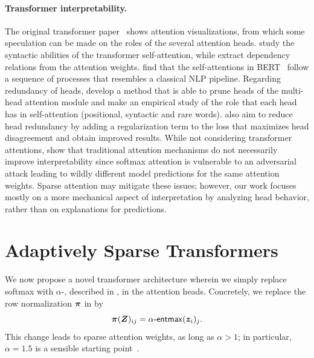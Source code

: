 \paragraph*{Transformer interpretability.} The original transformer
paper~\citep{vaswani2017attention} shows attention visualizations,
from which some speculation can be made on the roles of the several
attention heads. \citet{marecek-rosa-2018-extracting} study the
syntactic abilities of the transformer self-attention, while
\citet{raganato2018analysis} extract dependency relations from the
attention weights. \citet{bert-rediscovers} find that the
self-attentions in BERT~\citep{devlin2018bert} follow a sequence of
processes that resembles a classical NLP pipeline. Regarding
redundancy of heads, \citet{specialized} develop a method that is
able to prune heads of the multi-head attention module and make an
empirical study of the role that each head has in self-attention
(positional, syntactic and rare words). \citet{li2018multi} also aim
to reduce head redundancy by adding a regularization term to the loss
that maximizes head disagreement and obtain improved results. While
not considering transformer attentions, \citet{jain2019attention}
show that traditional attention mechanisms do not necessarily improve
interpretability since softmax attention is vulnerable to an
adversarial attack leading to wildly different model predictions for
the same attention weights. Sparse attention may mitigate these
issues; however, our work focuses mostly on a more mechanical aspect
of interpretation by analyzing head behavior, rather than on
explanations for predictions.

\section{Adaptively Sparse Transformers}
\label{sec:adaptive}

\noindent We now propose a novel transformer architecture wherein we simply replace
softmax with $\alpha$-\entmaxtext{}, described in
, in the attention heads. Concretely, we
replace the row normalization $\bm{\pi}$ in 
by
%
\begin{equation}
    \bm{\pi}(\bm{Z})_{ij} = \mathop{\mathsf{\alpha}\textnormal{-}\mathsf{entmax}}(\bm{z}_i)_j.
\end{equation}
%
This change leads to sparse attention weights, as long as
$\alpha>1$; in particular, $\alpha=1.5$ is a sensible starting
point~\citep{entmax}.

